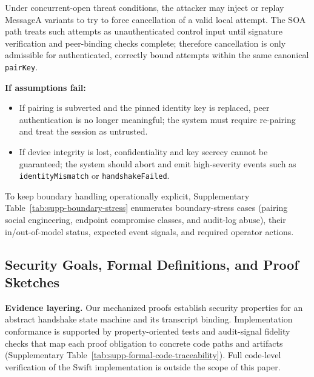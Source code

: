 \documentclass[10pt,journal,compsoc]{IEEEtran}
\providecommand{\tightlist}{%
  \setlength{\itemsep}{0pt}\setlength{\parskip}{0pt}}
\begin{document}
Under concurrent-open threat conditions, the attacker may inject or
replay MessageA variants to try to force cancellation of a valid local
attempt. The SOA path treats such attempts as unauthenticated control
input until signature verification and peer-binding checks complete;
therefore cancellation is only admissible for authenticated, correctly
bound attempts within the same canonical \texttt{pairKey}.

\textbf{If assumptions fail:}
\begin{itemize}\tightlist
\item
  If pairing is subverted and the pinned identity key is replaced,
  peer authentication is no longer meaningful; the system must require
  re-pairing and treat the session as untrusted.
\item
  If device integrity is lost, confidentiality and key secrecy cannot be
  guaranteed; the system should abort and emit high-severity events such
  as \texttt{identity}\allowbreak\texttt{Mismatch} or
  \texttt{handshake}\allowbreak\texttt{Failed}.
\end{itemize}

To keep boundary handling operationally explicit, Supplementary
Table~\ref{tab:supp-boundary-stress} enumerates boundary-stress cases
(pairing social engineering, endpoint compromise classes, and audit-log
abuse), their in/out-of-model status, expected event signals, and
required operator actions.

\subsection{Security Goals, Formal Definitions, and Proof
Sketches}\label{b.-security-goals-and-proof-sketches}

\textbf{Evidence layering.} Our mechanized proofs establish security
properties for an abstract handshake state machine and its transcript
binding. Implementation conformance is supported by property-oriented
tests and audit-signal fidelity checks that map each proof obligation to
concrete code paths and artifacts (Supplementary
Table~\ref{tab:supp-formal-code-traceability}). Full code-level
verification of the Swift implementation is outside the scope of this
paper.
\end{document}
